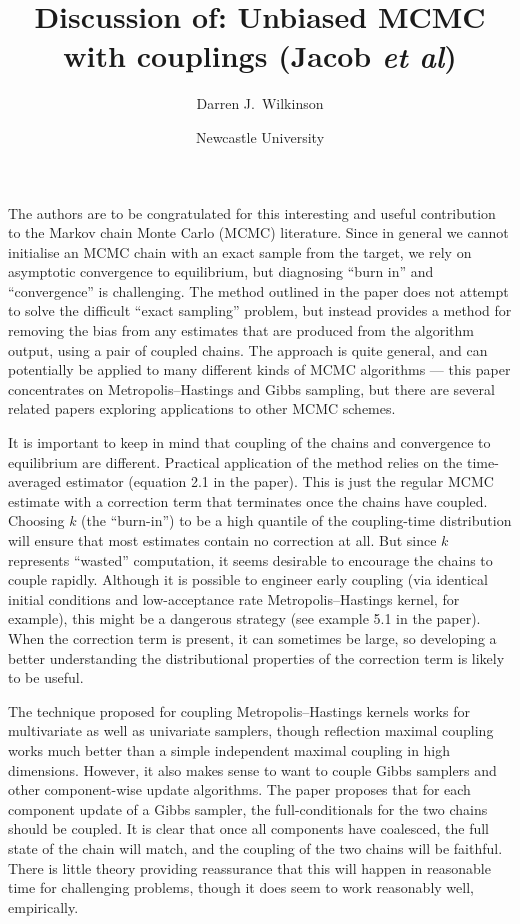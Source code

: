 \documentclass[11pt,a4paper]{article}
\title{Discussion of: Unbiased MCMC with couplings (Jacob \emph{et al})}
\author{Darren J.\ Wilkinson}
\date{Newcastle University}
\begin{document}
\maketitle

The authors are to be congratulated for this interesting and useful contribution to the Markov chain Monte Carlo (MCMC) literature. Since in general we cannot initialise an MCMC chain with an exact sample from the target, we rely on asymptotic convergence to equilibrium, but diagnosing ``burn in'' and ``convergence'' is challenging.
The method outlined in the paper does not attempt to solve the difficult ``exact sampling'' problem, but instead provides a method for removing the bias from any estimates that are produced from the algorithm output, using a pair of coupled chains.
The approach is quite general, and can potentially be applied to many different kinds of MCMC algorithms --- this paper concentrates on Metropolis--Hastings and Gibbs sampling, but there are several related papers exploring applications to other MCMC schemes. 

It is important to keep in mind that coupling of the chains and convergence to equilibrium are different. Practical application of the method relies on the
time-averaged estimator (equation 2.1 in the paper).
This is just the regular MCMC estimate with a correction term that terminates once the chains have coupled. Choosing $k$ (the ``burn-in'') to be a high quantile of the coupling-time distribution will ensure that most estimates contain no correction at all. But since $k$ represents ``wasted'' computation, it seems desirable to encourage the chains to couple rapidly. Although it is possible to engineer early coupling (via identical initial conditions and low-acceptance rate Metropolis--Hastings kernel, for example), this might be a dangerous strategy (see example 5.1 in the paper). When the correction term is present, it can sometimes be large, so developing a better understanding the distributional properties of the correction term is likely to be useful.

The technique proposed for coupling Metropolis--Hastings kernels works for multivariate as well as univariate samplers, though reflection maximal coupling works much better than a simple independent maximal coupling in high dimensions. However, it also makes sense to want to couple Gibbs samplers and other component-wise update algorithms. The paper proposes that for each component update of a Gibbs sampler, the full-conditionals for the two chains should be coupled. It is clear that once all components have coalesced, the full state of the chain will match, and the coupling of the two chains will be faithful. There is little theory providing reassurance that this will happen in reasonable time for challenging problems, though it does seem to work reasonably well, empirically.
  
\end{document}
